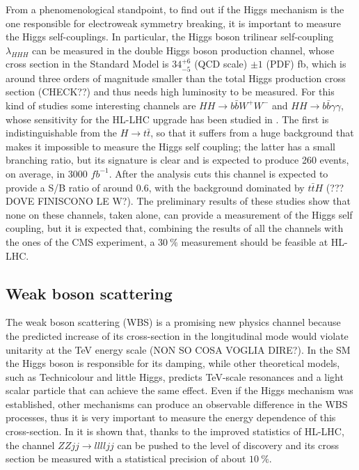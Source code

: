 \documentclass[a4paper,twoside,12pt]{article}
\begin{document}
\bigskip
\bigskip
\bigskip


From a phenomenological standpoint, to find out if the Higgs mechanism is the one responsible
for electroweak symmetry breaking, it is important to measure the Higgs self-couplings.
In particular, the Higgs boson trilinear self-coupling $\lambda_{HHH}$ can be measured
in the double Higgs boson production channel, whose cross section in the Standard Model is
$34^{+6}_{-5}$ (QCD scale) $\pm 1$ (PDF) fb, which is around three orders of magnitude
smaller than the total Higgs production cross section (CHECK??) and thus needs high
luminosity to be measured. For this kind of studies some interesting channels are
$HH \rightarrow b\bar{b}W^+W^-$ and $HH \rightarrow b\bar{b}\gamma\gamma$, whose 
sensitivity for the HL-LHC upgrade has been studied in \cite{HHStudies}. The first is 
indistinguishable from the $H \rightarrow t\bar{t}$, so that it suffers from a huge background
that makes it impossible to measure the Higgs self coupling; the latter has a small branching
ratio, but its signature is clear and is expected to produce 260 events, on average, in 3000 $fb^{-1}$. After the analysis cuts this channel is expected to provide a S/B ratio of around 0.6, with the background
dominated by $t\bar{t}H$ (??? DOVE FINISCONO LE W?). The preliminary results of these
studies show that none on these channels, taken alone, can provide a measurement of
the Higgs self coupling, but it is expected that, combining the results of all the channels with 
the ones of the CMS experiment, a $30\ \%$ measurement should be feasible at HL-LHC.

\subsection{Weak boson scattering}
The weak boson scattering (WBS) is a promising new physics channel because the predicted increase of
its cross-section
in the longitudinal mode would violate unitarity at the TeV energy scale (NON SO COSA VOGLIA DIRE?). In the SM the Higgs
boson is responsible for its damping, while other theoretical models, such as Technicolour and 
little Higgs, predicts TeV-scale resonances and a light scalar particle that can achieve the same effect. Even if the Higgs
mechanism was established, other mechanisms can produce an observable difference in
the WBS processes, thus it is very important to measure the energy 
dependence of this cross-section. In \cite{WBS} it is shown that, thanks to the improved
statistics of HL-LHC, the channel $ZZjj \rightarrow lllljj$ can be pushed to the level of discovery and its cross section be measured with a statistical precision of about $10\ \%$.
\end{document}

